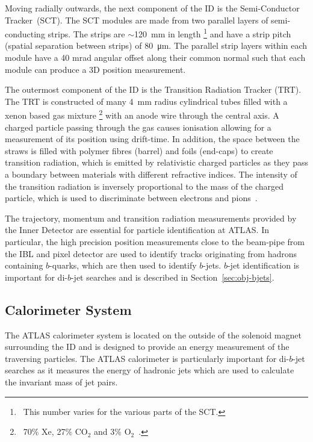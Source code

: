 Moving radially outwards, the next component of the ID is the Semi-Conductor Tracker~(SCT).
The SCT modules are made from two parallel layers of semi-conducting strips.
The strips are $\sim$\SI{120}{\mm} in length \footnote{\ This number varies for the various parts of the SCT.}
and have a strip pitch (spatial separation between strips) of \SI{80}{\micro\metre}.
The parallel strip layers within each module have a 40 mrad angular offset along their common normal
such that each module can produce a 3D position measurement.

The outermost component of the ID is the Transition Radiation Tracker (TRT).
The TRT is constructed of many \SI{4}{\mm} radius cylindrical tubes filled with a xenon based gas mixture
\footnote{\ 70\% Xe, 27\% $\text{CO}_2$ and 3\% $\text{O}_2$~\cite{det-ID_xe}.}
with an anode wire through the central axis.
A charged particle passing through the gas causes ionisation allowing for a measurement of its position using drift-time.
In addition, the space between the straws is filled with polymer fibres (barrel) and foils (end-caps) to create transition radiation,
which is emitted by relativistic charged particles as they pass a boundary between materials with different refractive indices.
The intensity of the transition radiation is inversely proportional to the mass of the charged particle,
which is used to discriminate between electrons and pions~\cite{det-ID_TR}.

The trajectory, momentum and transition radiation measurements provided by the Inner Detector are essential for particle identification at ATLAS.
In particular, the high precision position measurements close to the beam-pipe from the IBL and pixel detector
are used to identify tracks originating from hadrons containing $b$-quarks, which are then used to identify $b$-jets.
$b$-jet identification is important for di-$b$-jet searches and is described in Section~\ref{sec:obj-bjets}.

\newpage
\subsection{Calorimeter System}
\label{sec:det-calo}

The ATLAS calorimeter system is located on the outside of the solenoid magnet surrounding the ID and
is designed to provide an energy measurement of the traversing particles.
The ATLAS calorimeter is particularly important for di-$b$-jet searches as it measures the
energy of hadronic jets which are used to calculate the invariant mass of jet pairs. %

